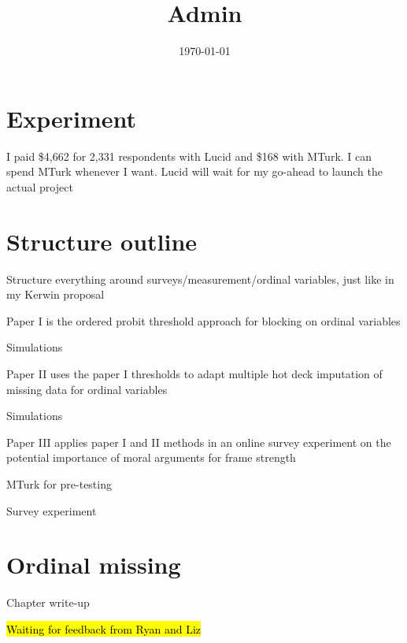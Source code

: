 

\title{Admin}

\date{\today}



\maketitle


\section*{Experiment}
	\begin{coi}
		\item I paid \$4,662 for 2,331 respondents with Lucid and \$168 with MTurk. I can spend MTurk whenever I want. Lucid will wait for my go-ahead to launch the actual project
	\end{coi}	
	
\section*{Structure outline}
	\begin{coi}
		\item Structure everything around surveys/measurement/ordinal variables, just like in my Kerwin proposal
		\item Paper I is the ordered probit threshold approach for blocking on ordinal variables
			\begin{coi}
				\item Simulations
			\end{coi}
		\item Paper II uses the paper I thresholds to adapt multiple hot deck imputation of missing data for ordinal variables
			\begin{coi}
				\item Simulations
			\end{coi}
		\item Paper III applies paper I and II methods in an online survey experiment on the potential importance of moral arguments for frame strength
			\begin{coi}
				\item MTurk for pre-testing
				\item Survey experiment
			\end{coi}
	\end{coi}


\section*{Ordinal missing}
	\begin{coi}
		\item Chapter write-up
			\begin{coi}
				\item \hl{Waiting for feedback from Ryan and Liz}
			\end{coi}
	\end{coi}
	

